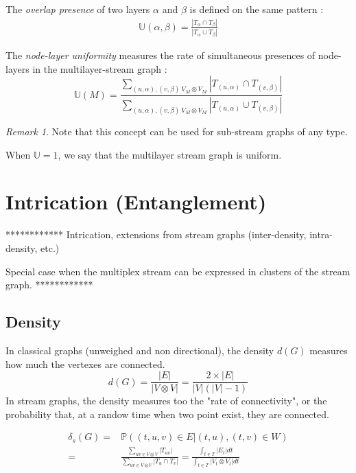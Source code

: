 \documentclass[dvipsnames,a4paper,11pt]{article}
\theoremstyle{definition}
\theoremstyle{remark}
\newtheorem{rmq}{Remark}
\theoremstyle{remark}
\begin{document}
	The {\em overlap presence} of two layers $\alpha$ and $\beta$ is defined on the same pattern :
	\begin{align*}
		\mathbb{U}(\alpha,\beta) = \frac{|T_{\alpha}\cap T_{\beta}|}{|T_{\alpha}\cup T_{\beta}|}
	\end{align*}

    The {\em node-layer uniformity} measures the rate of simultaneous presences of node-layers in the multilayer-stream graph :
    \[
    	\mathbb{U}(M) = \frac{\sum_{(u,\alpha),(v,\beta) \ V_M \otimes V_M}{|T_{(u,\alpha)} \cap T_{(v,\beta)}|}}{\sum_{(u,\alpha),(v,\beta) \ V_M \otimes V_M}{|T_{(u,\alpha)}\cup T_{(v,\beta)}|}}
    \]



	\begin{rmq}
		Note that this concept can be used for sub-stream graphs of any type.
	\end{rmq}

	When $\mathbb{U}=1$, we say that the multilayer stream graph is uniform.





    \section{Intrication (Entanglement)}

	************
    Intrication, extensions from stream graphs (inter-density, intra-density, etc.)

    Special case when the multiplex stream can be expressed in clusters of the stream graph.
    ************



    \subsection{Density}
	In classical graphs (unweighed and non directional), the density $d(G)$ measures how much the vertexes are connected.
		\[
			d(G) = \frac{|E|}{|V\otimes V|} = \frac{2\times |E|}{|V|(|V|-1)}
		\]
	In stream graphs, the density measures too the "rate of connectivity", or the probability that, at a randow time when two point exist, they are connected.

		\begin{align*}
			\delta_s(G) = & \mathbb{P}((t,u,v)\in E| (t,u),(t,v) \in W) \\
			 =  & \frac{\sum_{uv \in V \otimes V}{|T_{uv}|}}{\sum_{uv \in V\otimes V}{|T_u\cap T_v|}}= \frac{\int_{t\in T}{|E_t|dt}}{\int_{t\in T}{|V_t\otimes V_t|dt}}
		\end{align*}
\end{document}
